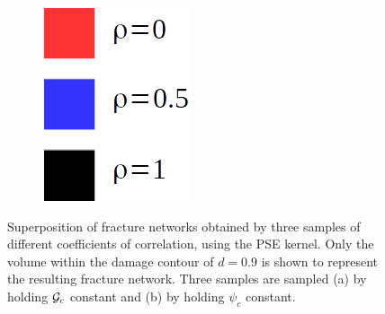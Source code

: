 \begin{figure}[!htbp]
\begin{subfigure}[b]{0.4\textwidth}
    \caption{}
    \label{fig: Chapter4/2D/morphology_Gc_constant}
  \end{subfigure}
  \begin{subfigure}[b]{0.1\textwidth}
    \includegraphics[width=\textwidth]{Chapter4/figures/rho.png}
    \caption*{}
    \vspace{0.75in}
  \end{subfigure}
  \caption{ Superposition of fracture networks obtained by three samples of different coefficients of correlation, using the PSE kernel. Only the volume within the damage contour of $d = 0.9$ is shown to represent the resulting fracture network. Three samples are sampled (a) by holding ${\mathcal{G}_c}$ constant and (b) by holding $\psi_c$ constant. }
  \label{fig: Chapter4/2D/compare_morphology}
\end{figure}
